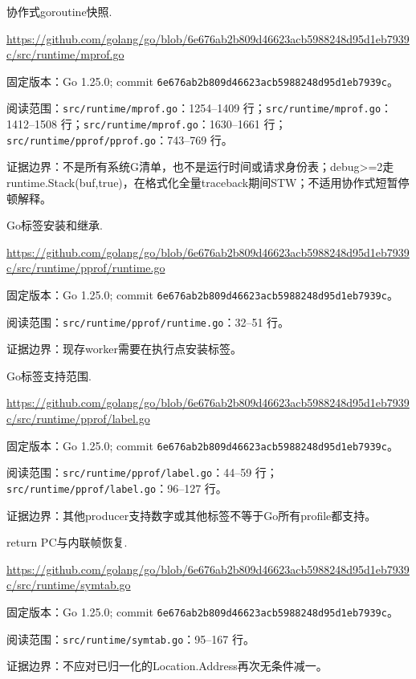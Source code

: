\documentclass[UTF8,fontset=fandol,openany,11pt]{ctexbook}
\begin{document}
\begin{thebibliography}{999}
 协作式goroutine快照.\par
\url{https://github.com/golang/go/blob/6e676ab2b809d46623acb5988248d95d1eb7939c/src/runtime/mprof.go}\par
{\small\raggedright 固定版本：Go 1.25.0; commit \texttt{6e676ab2\allowbreak{}b809d466\allowbreak{}23acb598\allowbreak{}8248d95d\allowbreak{}1eb7939c}。\par
阅读范围：\nolinkurl{src/runtime/mprof.go}：1254–1409 行；\nolinkurl{src/runtime/mprof.go}：1412–1508 行；\nolinkurl{src/runtime/mprof.go}：1630–1661 行；\nolinkurl{src/runtime/pprof/pprof.go}：743–769 行。\par
证据边界：不是所有系统G清单，也不是运行时间或请求身份表；debug>=2走runtime.Stack(buf,true)，在格式化全量traceback期间STW；不适用协作式短暂停顿解释。
}

 Go标签安装和继承.\par
\url{https://github.com/golang/go/blob/6e676ab2b809d46623acb5988248d95d1eb7939c/src/runtime/pprof/runtime.go}\par
{\small\raggedright 固定版本：Go 1.25.0; commit \texttt{6e676ab2\allowbreak{}b809d466\allowbreak{}23acb598\allowbreak{}8248d95d\allowbreak{}1eb7939c}。\par
阅读范围：\nolinkurl{src/runtime/pprof/runtime.go}：32–51 行。\par
证据边界：现存worker需要在执行点安装标签。
}

 Go标签支持范围.\par
\url{https://github.com/golang/go/blob/6e676ab2b809d46623acb5988248d95d1eb7939c/src/runtime/pprof/label.go}\par
{\small\raggedright 固定版本：Go 1.25.0; commit \texttt{6e676ab2\allowbreak{}b809d466\allowbreak{}23acb598\allowbreak{}8248d95d\allowbreak{}1eb7939c}。\par
阅读范围：\nolinkurl{src/runtime/pprof/label.go}：44–59 行；\nolinkurl{src/runtime/pprof/label.go}：96–127 行。\par
证据边界：其他producer支持数字或其他标签不等于Go所有profile都支持。
}

 return PC与内联帧恢复.\par
\url{https://github.com/golang/go/blob/6e676ab2b809d46623acb5988248d95d1eb7939c/src/runtime/symtab.go}\par
{\small\raggedright 固定版本：Go 1.25.0; commit \texttt{6e676ab2\allowbreak{}b809d466\allowbreak{}23acb598\allowbreak{}8248d95d\allowbreak{}1eb7939c}。\par
阅读范围：\nolinkurl{src/runtime/symtab.go}：95–167 行。\par
证据边界：不应对已归一化的Location.Address再次无条件减一。
}


\end{thebibliography}
\end{document}
